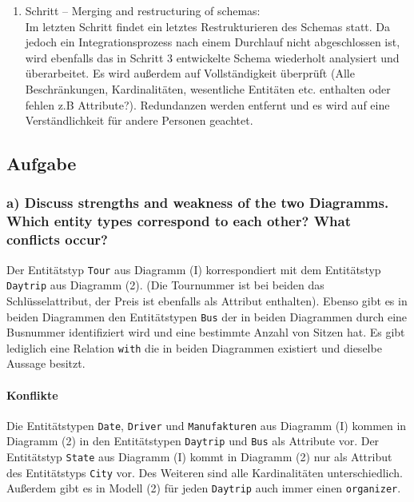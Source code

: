 \documentclass[11pt,a4paper,DIV=9]{scrartcl}
\newcounter{temp}
\newcommand{\aufgabe}[1]{
  \setcounter{temp}{\value{subsection}}
  \setcounter{subsection}{#1}
  \addtocounter{subsection}{-1}
  \subsection{Aufgabe}
  \setcounter{subsection}{\value{temp}}
}
\newcommand{\teil}[2][]{
  \subsubsection*{#2) #1}
}
\begin{document}
\begin{enumerate}
    \item Schritt -- Merging and restructuring of schemas: \\
    Im letzten Schritt findet ein letztes Restrukturieren des Schemas statt. Da jedoch ein Integrationsprozess nach einem Durchlauf nicht abgeschlossen ist, wird ebenfalls das in Schritt 3 entwickelte Schema wiederholt analysiert und \"uberarbeitet. Es wird au{\ss}erdem auf Vollst\"andigkeit \"uberpr\"uft (Alle Beschr\"ankungen, Kardinalit\"aten, wesentliche Entit\"aten etc. enthalten oder fehlen z.B Attribute?). Redundanzen werden entfernt und es wird auf eine Verst\"andlichkeit f\"ur andere Personen geachtet.
  \end{enumerate}

\aufgabe{3}
\teil[Discuss strengths and weakness of the two Diagramms. Which entity types correspond to each other? What conflicts occur?]{a}
  Der Entit\"atstyp \texttt{Tour} aus Diagramm (I) korrespondiert mit dem Entit\"atstyp \texttt{Daytrip} aus Diagramm (2). (Die Tournummer ist bei beiden das Schl\"usselattribut, der Preis ist ebenfalls als Attribut enthalten). Ebenso gibt es in beiden Diagrammen den Entit\"atstypen \texttt{Bus} der in beiden Diagrammen durch eine Busnummer identifiziert wird und eine bestimmte Anzahl von Sitzen hat. Es gibt lediglich eine Relation \texttt{with} die in beiden Diagrammen existiert und dieselbe Aussage besitzt.
  \paragraph{Konflikte} %
  \label{par:konflikte}
    Die Entit\"atstypen \texttt{Date}, \texttt{Driver} und \texttt{Manufakturen} aus Diagramm (I) kommen in Diagramm (2) in den Entit\"atstypen \texttt{Daytrip} und \texttt{Bus} als Attribute vor. Der Entit\"atstyp \texttt{State} aus Diagramm (I) kommt in Diagramm (2) nur als Attribut des Entit\"atstyps \texttt{City} vor. Des Weiteren sind alle Kardinalit\"aten unterschiedlich. Au{\ss}erdem gibt es in Modell (2) f\"ur jeden \texttt{Daytrip} auch immer einen \texttt{organizer}.
\end{document}
